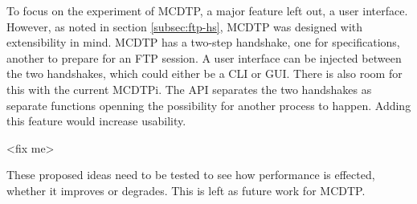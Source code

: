 To focus on the experiment of MCDTP, a major feature left out, a user interface. However, as noted in section \ref{subsec:ftp-hs}, MCDTP was designed with extensibility in mind. MCDTP has a two-step handshake, one for specifications, another to prepare for an FTP session. A user interface can be injected between the two handshakes, which could either be a CLI or GUI. There is also room for this with the current MCDTPi. The API separates the two handshakes as separate functions openning the possibility for another process to happen. Adding this feature would increase usability.

<fix me>

These proposed ideas need to be tested to see how performance is effected, whether it improves or degrades. This is left as future work for MCDTP.